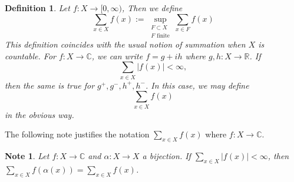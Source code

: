 \documentclass[12pt]{amsart}
\newtheorem{defn}[thm]{Definition}
\newtheorem{note}[thm]{Note}
\newcommand{\al}{\alpha}
\newcommand{\C}{\mathbb{C}}
\newcommand{\R}{\mathbb{R}}
\newcommand{\Rg}{[0,\infty)}
\begin{document}
	\begin{defn}
		Let $f:X \rightarrow \Rg$, Then we define $$\sum_{x \in X} f(x) := \sup_{\substack{F \subset X \\ F \text{ finite}}} \sum_{x \in F} f(x)$$ This definition coincides with the usual notion of summation when $X$ is countable. For $f:X \rightarrow \C$, we can write $f = g +ih$ where $g,h:X \rightarrow \R$. If $$\sum_{x \in X}|f(x)| < \infty,$$ then the same is true for $g^+,g^-,h^+,h^-$. In this case, we may define $$\sum_{x \in X} f(x)$$ in the obvious way.
	\end{defn} 
	
	The following note justifies the notation $\sum_{x \in X}f(x)$ where $f:X \rightarrow \C$.
	
	\begin{note}
		Let $f:X \rightarrow \C$ and $\al:X \rightarrow X$ a bijection. If $\sum_{x \in X}|f(x)|< \infty$, then $\sum_{x \in X}f( \al (x)) = \sum_{x \in X}f(x) $.
	\end{note}
	
\end{document}

